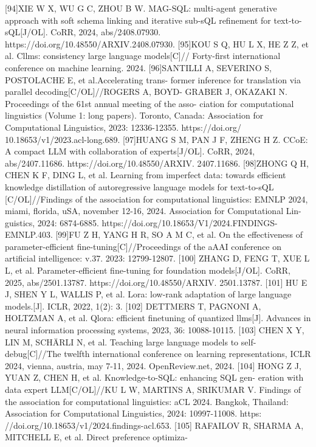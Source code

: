 \documentclass[12pt,a4paper,openright,UTF8]{ctexbook}
\begin{document}
[94]XIE W X, WU G C, ZHOU B W. MAG-SQL: multi-agent generative approach
with soft schema linking and iterative sub-sQL refinement for text-to-sQL[J/OL].
CoRR, 2024, abs/2408.07930. https://doi.org/10.48550/ARXIV.2408.07930.
[95]KOU S Q, HU L X, HE Z Z, et al. Cllms: consistency large language models[C]//
Forty-first international conference on machine learning. 2024.
[96]SANTILLI A, SEVERINO S, POSTOLACHE E, et al.Accelerating trans-
former inference for translation via parallel decoding[C/OL]//ROGERS A, BOYD-
GRABER J, OKAZAKI N. Proceedings of the 61st annual meeting of the asso-
ciation for computational linguistics (Volume 1: long papers). Toronto, Canada:
Association for Computational Linguistics, 2023: 12336-12355. https://doi.org/
10.18653/v1/2023.acl-long.689.
[97]HUANG S M, PAN J F, ZHENG H Z. CCoE: A compact LLM with collaboration
of experts[J/OL]. CoRR, 2024, abs/2407.11686. https://doi.org/10.48550/ARXIV.
2407.11686.
[98]ZHONG Q H, CHEN K F, DING L, et al. Learning from imperfect data: towards
efficient knowledge distillation of autoregressive language models for text-to-sQL
[C/OL]//Findings of the association for computational linguistics: EMNLP 2024,
miami, florida, uSA, november 12-16, 2024. Association for Computational Lin-
guistics, 2024: 6874-6885. https://doi.org/10.18653/V1/2024.FINDINGS-
EMNLP.403.
[99]FU Z H, YANG H R, SO A M C, et al. On the effectiveness of parameter-efficient
fine-tuning[C]//Proceedings of the aAAI conference on artificial intelligence: v.37.
2023: 12799-12807.
[100] ZHANG D, FENG T, XUE L L, et al. Parameter-efficient fine-tuning for foundation
models[J/OL]. CoRR, 2025, abs/2501.13787. https://doi.org/10.48550/ARXIV.
2501.13787.
[101] HU E J, SHEN Y L, WALLIS P, et al. Lora: low-rank adaptation of large language
models.[J]. ICLR, 2022, 1(2): 3.
[102] DETTMERS T, PAGNONI A, HOLTZMAN A, et al. Qlora: efficient finetuning
of quantized llms[J]. Advances in neural information processing systems, 2023,
36: 10088-10115.
[103] CHEN X Y, LIN M, SCHÄRLI N, et al. Teaching large language models to self-
debug[C]//The twelfth international conference on learning representations, ICLR
2024, vienna, austria, may 7-11, 2024. OpenReview.net, 2024.
[104] HONG Z J, YUAN Z, CHEN H, et al. Knowledge-to-SQL: enhancing SQL gen-
eration with data expert LLM[C/OL]//KU L W, MARTINS A, SRIKUMAR V.
Findings of the association for computational linguistics: aCL 2024. Bangkok,
Thailand: Association for Computational Linguistics, 2024: 10997-11008. https:
//doi.org/10.18653/v1/2024.findings-acl.653.
[105] RAFAILOV R, SHARMA A, MITCHELL E, et al. Direct preference optimiza-
\end{document}
